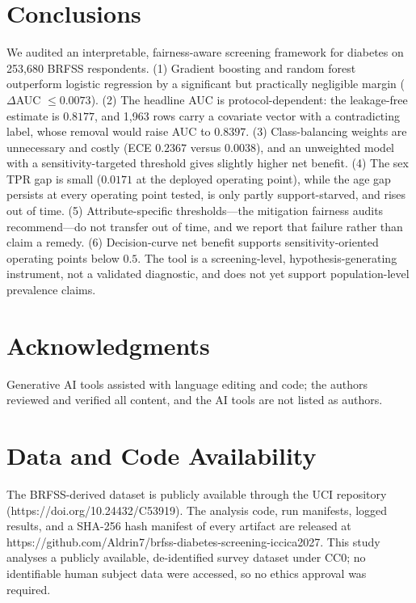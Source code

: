 \documentclass[conference]{IEEEtran}
\begin{document}
\section{Conclusions}
We audited an interpretable, fairness-aware screening framework for diabetes on 253{,}680 BRFSS respondents. (1) Gradient boosting and random forest outperform logistic regression by a significant but practically negligible margin ($\Delta$AUC $\le 0.0073$). (2) The headline AUC is protocol-dependent: the leakage-free estimate is $0.8177$, and 1{,}963 rows carry a covariate vector with a contradicting label, whose removal would raise AUC to $0.8397$. (3) Class-balancing weights are unnecessary and costly (ECE $0.2367$ versus $0.0038$), and an unweighted model with a sensitivity-targeted threshold gives slightly higher net benefit. (4) The sex TPR gap is small ($0.0171$ at the deployed operating point), while the age gap persists at every operating point tested, is only partly support-starved, and rises out of time. (5) Attribute-specific thresholds---the mitigation fairness audits recommend---do not transfer out of time, and we report that failure rather than claim a remedy. (6) Decision-curve net benefit supports sensitivity-oriented operating points below $0.5$. The tool is a screening-level, hypothesis-generating instrument, not a validated diagnostic, and does not yet support population-level prevalence claims.

\section*{Acknowledgments}
Generative AI tools assisted with language editing and code; the authors reviewed and verified all content, and the AI tools are not listed as authors.

\section*{Data and Code Availability}
The BRFSS-derived dataset is publicly available through the UCI repository (https://doi.org/10.24432/C53919). The analysis code, run manifests, logged results, and a SHA-256 hash manifest of every artifact are released at https://github.com/Aldrin7/brfss-diabetes-screening-iccica2027. This study analyses a publicly available, de-identified survey dataset under CC0; no identifiable human subject data were accessed, so no ethics approval was required.
\end{document}
